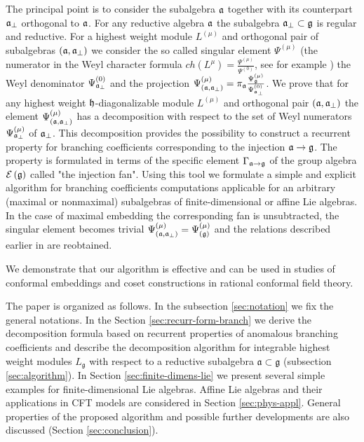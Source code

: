 The principal point is to consider the subalgebra $\mathfrak{a}$ together with its
counterpart $\mathfrak{a}_{\bot}$ orthogonal to $\mathfrak{a}$.
For any reductive algebra $\mathfrak{a}$ the subalgebra $\mathfrak{a}_{\bot} \subset \frak{g} $ is regular and reductive.
For a highest weight module $L^{\left( \mu \right)}$ and orthogonal pair of subalgebras
$\left(  \mathfrak{a}, \mathfrak{a}_{\bot} \right)$ we consider
the so called singular element $\Psi^{\left( \mu \right)}$ (the numerator
in the Weyl character formula
$ch\left( L^{\mu }\right) =\frac{\Psi ^{\left( \mu \right) }}{\Psi ^{\left( 0\right) }}$,
see for example \cite{humphreys1997introduction})
the Weyl denominator $\Psi ^{\left( 0\right) }_{\mathfrak{a}_{\bot}}$ and the projection
$\Psi ^{\left( \mu \right) }_{\left(  \mathfrak{a}, \mathfrak{a}_{\bot} \right)}
=\pi_{\mathfrak{a}}\frac{\Psi ^{\left( \mu \right) }_{\frak{g}}}{\Psi ^{\left( 0\right) }_{\mathfrak{a}_{\bot}}}$.
We prove that for any highest weight $\mathfrak{h}$-diagonalizable module $L^{\left( \mu \right)}$ and orthogonal pair
$\left(  \mathfrak{a}, \mathfrak{a}_{\bot} \right)$ the element
$\Psi ^{\left( \mu \right) }_{\left(  \mathfrak{a}, \mathfrak{a}_{\bot} \right)}$ has a decomposition with respect to
the set of Weyl numerators $\Psi ^{\left( \mu \right) }_{ \mathfrak{a}_{\bot} }$ of $\mathfrak{a}_{\bot}$.
This decomposition provides the possibility to construct a recurrent property for branching coefficients corresponding
to the injection $\frak{a} \rightarrow \frak{g} $.
The property is formulated in
terms of the specific element $\Gamma_{\mathfrak{a} \rightarrow \mathfrak{g}}$ of the group algebra
$\mathcal{E}\left( \frak{g} \right)$ called "the injection fan".
Using this tool we formulate a simple and
explicit algorithm for branching coefficients computations applicable for an arbitrary (maximal or nonmaximal)
subalgebras of finite-dimensional or affine Lie algebras.
In the case of maximal embedding the corresponding fan is unsubtracted, the singular element
becomes trivial
$\Psi ^{\left( \mu \right) }_{\left(  \mathfrak{a}, \mathfrak{a}_{\bot} \right)}=\Psi ^{\left( \mu \right) }_{\left(  \mathfrak{g}\right)}$
and the relations described earlier in \cite{ilyin812pbc} are reobtained.

We demonstrate that our algorithm is effective and can be used in studies
of conformal embeddings and coset constructions in rational conformal field theory.

The paper is organized as follows. In the subsection \ref{sec:notation}  we fix the general notations.
In the Section \ref{sec:recurr-form-branch} we derive the decomposition formula based on
recurrent properties of anomalous branching coefficients and describe the decomposition algorithm
for integrable highest weight modules
$L_{\mathfrak{g}}$ with respect to a reductive subalgebra $\mathfrak{a}\subset \mathfrak{g}$
(subsection \ref{sec:algorithm}). In Section \ref{sec:finite-dimens-lie} we present several
simple examples for finite-dimensional Lie algebras. Affine Lie algebras and their applications in
CFT models are considered in Section \ref{sec:phys-appl}.
General properties of the proposed algorithm and
possible further developments are also discussed (Section \ref{sec:conclusion}).

